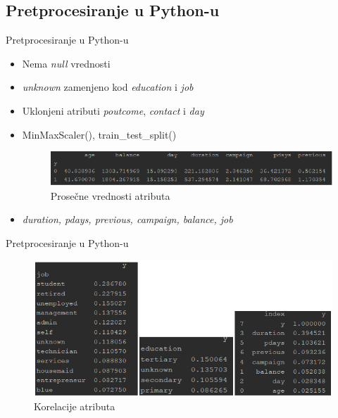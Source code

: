 \documentclass{beamer}
\begin{document}
\subsection{Pretprocesiranje u Python-u}
\begin{frame}{Pretprocesiranje u Python-u}
    	\begin{itemize}
		\item Nema \textit{null} vrednosti
		\item \textit{unknown} zamenjeno kod \textit{education} i \textit{job}		
		\item Uklonjeni atributi \textit{poutcome}, \textit{contact} i \textit{day}
		\item MinMaxScaler(), train\_test\_split()
		
		\begin{figure}[h!]
                \begin{center}
                \includegraphics[scale=0.70]{prosecne_vrednosti.png}
                \end{center}
                \caption{Prosečne vrednosti atributa}
                \label{fig:prosecne_vrednosti}
         \end{figure}
		
		\item \textit{duration, pdays, previous, campaign, balance, job}
	\end{itemize}	
\end{frame}

\begin{frame}{Pretprocesiranje u Python-u}
    	
		
		\begin{figure}[h!]
                \begin{center}
                \includegraphics[scale=0.50]{korelacije.png}
                \end{center}
                \caption{Korelacije atributa}
                \label{fig:korelacije}
         \end{figure}
		
			
\end{frame}
\end{document}
